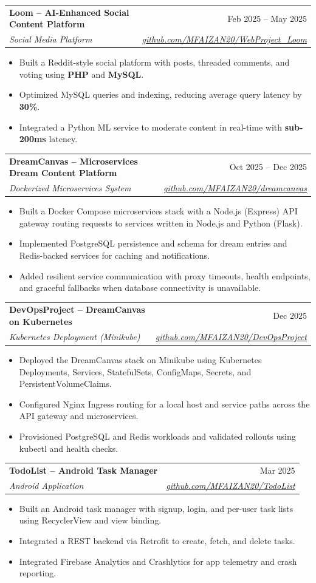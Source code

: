 \documentclass[letterpaper,11pt]{article}
\makeatletter
\newcommand{\resumeItem}[1]{\item\small{{
 #1 \vspace{-2pt}}
}}
\newcommand{\resumeSubheading}[4]{\vspace{-2pt}\item
    \begin{tabular*}{0.97\textwidth}[t]{l@{\extracolsep{\fill}}r}
      \textbf{#1} & #2 \\
      \textit{\small#3} & \textit{\small #4} \\
    \end{tabular*}\vspace{-7pt}
}
\newcommand{\resumeItemListStart}{\begin{itemize}}
\newcommand{\resumeItemListEnd}{\end{itemize}\vspace{-5pt}}
\makeatother
\begin{document}
    \resumeSubheading
      {Loom -- AI-Enhanced Social Content Platform}{Feb 2025 -- May 2025}
      {Social Media Platform}{\href{https://github.com/MFAIZAN20/WebProject_Loom}{github.com/MFAIZAN20/WebProject\_Loom}}
      \resumeItemListStart
        \resumeItem{Built a Reddit-style social platform with posts, threaded comments, and voting using \textbf{PHP} and \textbf{MySQL}.}
        \resumeItem{Optimized MySQL queries and indexing, reducing average query latency by \textbf{30\%}.}
        \resumeItem{Integrated a Python ML service to moderate content in real-time with \textbf{sub-200ms} latency.}
      \resumeItemListEnd

    \resumeSubheading
      {DreamCanvas -- Microservices Dream Content Platform}{Oct 2025 -- Dec 2025}
      {Dockerized Microservices System}{\href{https://github.com/MFAIZAN20/dreamcanvas}{github.com/MFAIZAN20/dreamcanvas}}
      \resumeItemListStart
        \resumeItem{Built a Docker Compose microservices stack with a Node.js (Express) API gateway routing requests to services written in Node.js and Python (Flask).}
        \resumeItem{Implemented PostgreSQL persistence and schema for dream entries and Redis-backed services for caching and notifications.}
        \resumeItem{Added resilient service communication with proxy timeouts, health endpoints, and graceful fallbacks when database connectivity is unavailable.}
      \resumeItemListEnd

    \resumeSubheading
      {DevOpsProject -- DreamCanvas on Kubernetes}{Dec 2025}
      {Kubernetes Deployment (Minikube)}{\href{https://github.com/MFAIZAN20/DevOpsProject}{github.com/MFAIZAN20/DevOpsProject}}
      \resumeItemListStart
        \resumeItem{Deployed the DreamCanvas stack on Minikube using Kubernetes Deployments, Services, StatefulSets, ConfigMaps, Secrets, and PersistentVolumeClaims.}
        \resumeItem{Configured Nginx Ingress routing for a local host and service paths across the API gateway and microservices.}
        \resumeItem{Provisioned PostgreSQL and Redis workloads and validated rollouts using kubectl and health checks.}
      \resumeItemListEnd

    \resumeSubheading
      {TodoList -- Android Task Manager}{Mar 2025}
      {Android Application}{\href{https://github.com/MFAIZAN20/TodoList}{github.com/MFAIZAN20/TodoList}}
      \resumeItemListStart
        \resumeItem{Built an Android task manager with signup, login, and per-user task lists using RecyclerView and view binding.}
        \resumeItem{Integrated a REST backend via Retrofit to create, fetch, and delete tasks.}
        \resumeItem{Integrated Firebase Analytics and Crashlytics for app telemetry and crash reporting.}
      \resumeItemListEnd
\end{document}
